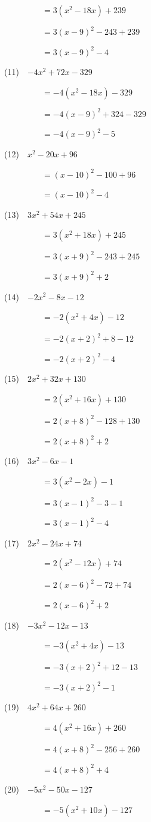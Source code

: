 \documentclass[a4j,twocolumn,10pt,fleqn]{jarticle}
\begin{document}
~~~~~~~~~$=3(x^2-18x) +239$

~~~~~~~~~$=3(x-9)^2-243+239$

~~~~~~~~~$=3(x-9)^2-4$

(11)~~$-4x^2 +72x-329$

~~~~~~~~~$=-4(x^2-18x)-329$

~~~~~~~~~$=-4(x-9)^2 +324-329$

~~~~~~~~~$=-4(x-9)^2-5$

(12)~~$x^2-20x +96$

~~~~~~~~~$=(x-10)^2 -100+96$

~~~~~~~~~$=(x-10)^2-4$

(13)~~$3x^2 +54x +245$

~~~~~~~~~$=3(x^2 +18x) +245$

~~~~~~~~~$=3(x +9)^2-243+245$

~~~~~~~~~$=3(x +9)^2 +2$

(14)~~$-2x^2-8x-12$

~~~~~~~~~$=-2(x^2 +4x)-12$

~~~~~~~~~$=-2(x +2)^2 +8-12$

~~~~~~~~~$=-2(x +2)^2-4$

(15)~~$2x^2 +32x +130$

~~~~~~~~~$=2(x^2 +16x) +130$

~~~~~~~~~$=2(x +8)^2-128+130$

~~~~~~~~~$=2(x +8)^2 +2$

(16)~~$3x^2-6x-1$

~~~~~~~~~$=3(x^2-2x)-1$

~~~~~~~~~$=3(x-1)^2-3-1$

~~~~~~~~~$=3(x-1)^2-4$

(17)~~$2x^2-24x +74$

~~~~~~~~~$=2(x^2-12x) +74$

~~~~~~~~~$=2(x-6)^2-72+74$

~~~~~~~~~$=2(x-6)^2 +2$

(18)~~$-3x^2-12x-13$

~~~~~~~~~$=-3(x^2 +4x)-13$

~~~~~~~~~$=-3(x +2)^2 +12-13$

~~~~~~~~~$=-3(x +2)^2-1$

(19)~~$4x^2 +64x +260$

~~~~~~~~~$=4(x^2 +16x) +260$

~~~~~~~~~$=4(x +8)^2-256+260$

~~~~~~~~~$=4(x +8)^2 +4$

(20)~~$-5x^2-50x-127$

~~~~~~~~~$=-5(x^2 +10x)-127$
\end{document}
